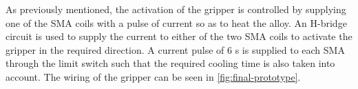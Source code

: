 As previously mentioned, the activation of the gripper is controlled by supplying one of the SMA coils with a pulse of current so as to heat the alloy. An H-bridge circuit is used to supply the current to either of the two SMA coils to activate the gripper in the required direction. A current pulse of $6$ s is supplied to each SMA through the limit switch such that the required cooling time is also taken into account. The wiring of the gripper can be seen in \cref{fig:final-prototype}.

\begin{figure}[h!] %
  \centering
  \begin{subfigure}[b]{0.27\textwidth}
\end{subfigure}
\end{figure}
